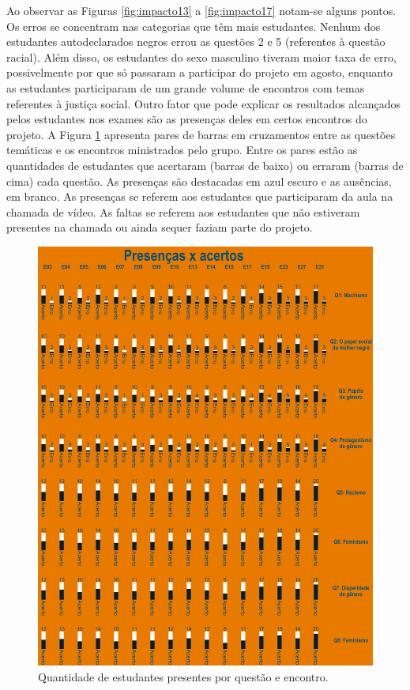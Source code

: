 \documentclass[
]{book}
\begin{document}
Ao observar as Figuras \ref{fig:impacto13} a \ref{fig:impacto17} notam-se alguns pontos. Os erros se concentram nas categorias que têm mais estudantes. Nenhum dos estudantes autodeclarados negros errou as questões 2 e 5 (referentes à questão racial). Além disso, os estudantes do sexo masculino tiveram maior taxa de erro, possivelmente por que só passaram a participar do projeto em agosto, enquanto as estudantes participaram de um grande volume de encontros com temas referentes à justiça social.
Outro fator que pode explicar os resultados alcançados pelos estudantes nos exames são as presenças deles em certos encontros do projeto. A Figura \ref{fig:impacto18} apresenta pares de barras em cruzamentos entre as questões temáticas e os encontros ministrados pelo grupo. Entre os pares estão as quantidades de estudantes que acertaram (barras de baixo) ou erraram (barras de cima) cada questão. As presenças são destacadas em azul escuro e as ausências, em branco. As presenças se referem aos estudantes que participaram da aula na chamada de vídeo. As faltas se referem aos estudantes que não estiveram presentes na chamada ou ainda sequer faziam parte do projeto.

\begin{figure}

{\centering \includegraphics[width=0.75\linewidth,height=0.75\textheight]{images/Impactos/18} 

}

\caption{Quantidade de estudantes presentes por questão e encontro.}\label{fig:impacto18}
\end{figure}
\end{document}
